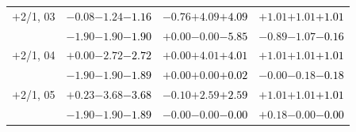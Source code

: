 \documentclass[compress]{beamer}
\begin{document}
\begin{frame}
\begin{tabular}{r | c | c | c}
$+$2/1, 03 & $-0.08$\hspace{0.1 cm}$-1.24$\hspace{0.1 cm}\textcolor{black}{$-1.16$} & $-0.76$\hspace{0.1 cm}$+4.09$\hspace{0.1 cm}\textcolor{black}{$+4.09$} & $+1.01$\hspace{0.1 cm}$+1.01$\hspace{0.1 cm}\textcolor{black}{$+1.01$} \\
           & $-1.90$\hspace{0.1 cm}$-1.90$\hspace{0.1 cm}\textcolor{black}{$-1.90$} & $+0.00$\hspace{0.1 cm}$-0.00$\hspace{0.1 cm}\textcolor{black}{$-5.85$} & $-0.89$\hspace{0.1 cm}$-1.07$\hspace{0.1 cm}\textcolor{black}{$-0.16$} \\
$+$2/1, 04 & $+0.00$\hspace{0.1 cm}$-2.72$\hspace{0.1 cm}\textcolor{black}{$-2.72$} & $+0.00$\hspace{0.1 cm}$+4.01$\hspace{0.1 cm}\textcolor{black}{$+4.01$} & $+1.01$\hspace{0.1 cm}$+1.01$\hspace{0.1 cm}\textcolor{black}{$+1.01$} \\
           & $-1.90$\hspace{0.1 cm}$-1.90$\hspace{0.1 cm}\textcolor{black}{$-1.89$} & $+0.00$\hspace{0.1 cm}$+0.00$\hspace{0.1 cm}\textcolor{black}{$+0.02$} & $-0.00$\hspace{0.1 cm}$-0.18$\hspace{0.1 cm}\textcolor{black}{$-0.18$} \\
$+$2/1, 05 & $+0.23$\hspace{0.1 cm}$-3.68$\hspace{0.1 cm}\textcolor{black}{$-3.68$} & $-0.10$\hspace{0.1 cm}$+2.59$\hspace{0.1 cm}\textcolor{black}{$+2.59$} & $+1.01$\hspace{0.1 cm}$+1.01$\hspace{0.1 cm}\textcolor{black}{$+1.01$} \\
           & $-1.90$\hspace{0.1 cm}$-1.90$\hspace{0.1 cm}\textcolor{black}{$-1.89$} & $-0.00$\hspace{0.1 cm}$-0.00$\hspace{0.1 cm}\textcolor{black}{$-0.00$} & $+0.18$\hspace{0.1 cm}$-0.00$\hspace{0.1 cm}\textcolor{black}{$-0.00$} \\

\end{tabular}
\end{frame}
\end{document}
